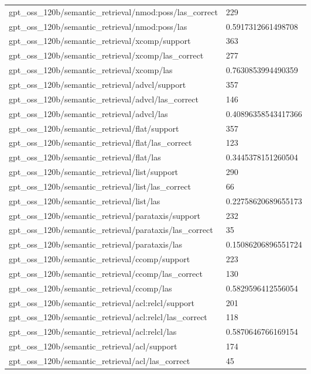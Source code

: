 \begin{tabular}{ll}
gpt\_oss\_120b/semantic\_retrieval/nmod:poss/las\_correct & 229 \\
gpt\_oss\_120b/semantic\_retrieval/nmod:poss/las & 0.5917312661498708 \\
gpt\_oss\_120b/semantic\_retrieval/xcomp/support & 363 \\
gpt\_oss\_120b/semantic\_retrieval/xcomp/las\_correct & 277 \\
gpt\_oss\_120b/semantic\_retrieval/xcomp/las & 0.7630853994490359 \\
gpt\_oss\_120b/semantic\_retrieval/advcl/support & 357 \\
gpt\_oss\_120b/semantic\_retrieval/advcl/las\_correct & 146 \\
gpt\_oss\_120b/semantic\_retrieval/advcl/las & 0.40896358543417366 \\
gpt\_oss\_120b/semantic\_retrieval/flat/support & 357 \\
gpt\_oss\_120b/semantic\_retrieval/flat/las\_correct & 123 \\
gpt\_oss\_120b/semantic\_retrieval/flat/las & 0.3445378151260504 \\
gpt\_oss\_120b/semantic\_retrieval/list/support & 290 \\
gpt\_oss\_120b/semantic\_retrieval/list/las\_correct & 66 \\
gpt\_oss\_120b/semantic\_retrieval/list/las & 0.22758620689655173 \\
gpt\_oss\_120b/semantic\_retrieval/parataxis/support & 232 \\
gpt\_oss\_120b/semantic\_retrieval/parataxis/las\_correct & 35 \\
gpt\_oss\_120b/semantic\_retrieval/parataxis/las & 0.15086206896551724 \\
gpt\_oss\_120b/semantic\_retrieval/ccomp/support & 223 \\
gpt\_oss\_120b/semantic\_retrieval/ccomp/las\_correct & 130 \\
gpt\_oss\_120b/semantic\_retrieval/ccomp/las & 0.5829596412556054 \\
gpt\_oss\_120b/semantic\_retrieval/acl:relcl/support & 201 \\
gpt\_oss\_120b/semantic\_retrieval/acl:relcl/las\_correct & 118 \\
gpt\_oss\_120b/semantic\_retrieval/acl:relcl/las & 0.5870646766169154 \\
gpt\_oss\_120b/semantic\_retrieval/acl/support & 174 \\
gpt\_oss\_120b/semantic\_retrieval/acl/las\_correct & 45 \\

\end{tabular}
